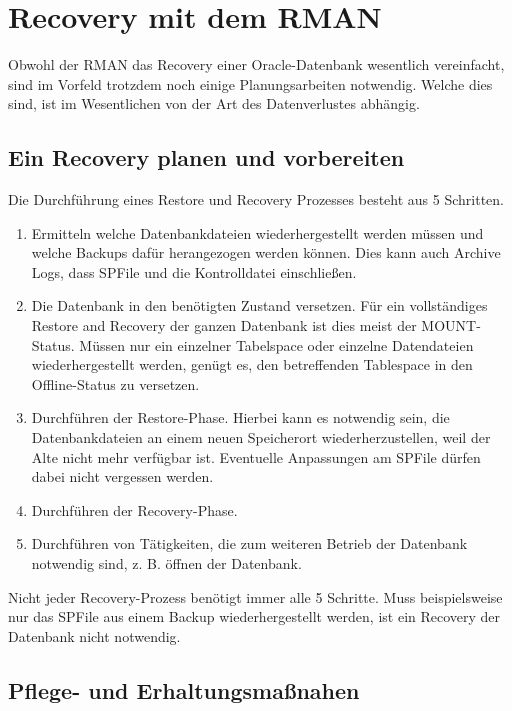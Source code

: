   \chapter{Recovery mit dem RMAN}
  \label{recoverywithrman}
    \setcounter{page}{1}
    \minitoc
\newpage
    Obwohl der RMAN das Recovery einer Oracle-Datenbank wesentlich vereinfacht, sind im Vorfeld trotzdem noch einige Planungsarbeiten notwendig. Welche dies sind, ist im Wesentlichen von der Art des Datenverlustes abh\"angig.
    \section{Ein Recovery planen und vorbereiten}
      Die Durchf\"uhrung eines Restore und Recovery Prozesses besteht aus 5 Schritten.
      \begin{enumerate}
        \item Ermitteln welche Datenbankdateien wiederhergestellt werden m\"ussen und welche Backups daf\"ur herangezogen werden k\"onnen. Dies kann auch Archive Logs, dass SPFile und die Kontrolldatei einschlie\ss{}en.
        \item Die Datenbank in den ben\"otigten Zustand versetzen. F\"ur ein vollst\"andiges Restore and Recovery der ganzen Datenbank ist dies meist der MOUNT-Status. M\"ussen nur ein einzelner Tabelspace oder einzelne Datendateien wiederhergestellt werden, gen\"ugt es, den betreffenden Tablespace in den Offline-Status zu versetzen.
        \item Durchf\"uhren der Restore-Phase. Hierbei kann es notwendig sein, die Datenbankdateien an einem neuen Speicherort wiederherzustellen, weil der Alte nicht mehr verf\"ugbar ist. Eventuelle Anpassungen am SPFile d\"urfen dabei nicht vergessen werden.
        \item Durchf\"uhren der Recovery-Phase.
        \item Durchf\"uhren von T\"atigkeiten, die zum weiteren Betrieb der Datenbank notwendig sind, z. B. \"offnen der Datenbank.
      \end{enumerate}
      Nicht jeder Recovery-Prozess ben\"otigt immer alle 5 Schritte. Muss beispielsweise nur das SPFile aus einem Backup wiederhergestellt werden, ist ein Recovery der Datenbank nicht notwendig.
    \section{Pflege- und Erhaltungsma\ss{}nahen}
